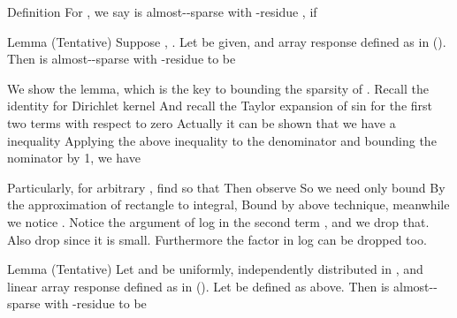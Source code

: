 \Result
{Definition}
{
For , we say  is almost--sparse with -residue , if
}

\Result
{Lemma (Tentative)}
{
Suppose , .
Let \m{\f} be given, and array response  defined as in ().
Then  is almost--sparse with -residue  to be
%
}

We show the lemma, which is the key to bounding the sparsity of .
Recall the identity for Dirichlet kernel
%
%
And recall the Taylor expansion of sin for the first two terms with respect to zero
%
%
Actually it can be shown that we have a inequality
%
%
Applying the above inequality to the denominator and bounding the nominator by 1, we have
%

Particularly, for arbitrary \m{\f}, find  so that
%
Then observe
So we need only bound
By the approximation of rectangle to integral,
Bound  by above technique, meanwhile we notice .
Notice the argument of log in the second term , and we drop that.
Also drop  since it is small.
Furthermore the \m{2\pi} factor in log can be dropped too.


\Result
{Lemma (Tentative)}
{
Let \m{\f} and \m{\th} be uniformly, independently distributed in \m{[0,2\pi)}, and linear array response  defined as in ().
Let  be defined as above.
Then  is almost--sparse with -residue  to be
%
}

